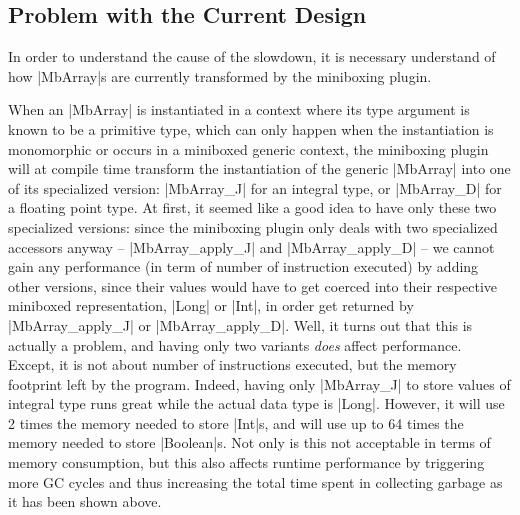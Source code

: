 \subsection{Problem with the Current Design}

In order to understand the cause of the slowdown, it is necessary understand of how |MbArray|s are currently transformed by the miniboxing plugin.

When an |MbArray| is instantiated in a context where its type argument is known to be a primitive type, which can only happen when the instantiation is monomorphic or occurs in a miniboxed generic context, the miniboxing plugin will at compile time transform the instantiation of the generic |MbArray| into one of its specialized version: |MbArray_J| for an integral type, or |MbArray_D| for a floating point type.
At first, it seemed like a good idea to have only these two specialized versions: since the miniboxing plugin only deals with two specialized accessors anyway -- |MbArray_apply_J| and |MbArray_apply_D| -- we cannot gain any performance (in term of number of instruction executed) by adding other versions, since their values would have to get coerced into their respective miniboxed representation, |Long| or |Int|, in order get returned by |MbArray_apply_J| or |MbArray_apply_D|.  
Well, it turns out that this is actually a problem, and having only two variants \emph{does} affect performance. Except, it is not about number of instructions executed, but the memory footprint left by the program. Indeed, having only |MbArray_J| to store values of integral type runs great while the actual data type is |Long|. However, it will use 2 times the memory needed to store |Int|s, and will use up to 64 times the memory needed to store |Boolean|s. Not only is this not acceptable in terms of memory consumption, but this also affects runtime performance by triggering more GC cycles and thus increasing the total time spent in collecting garbage as it has been shown above.



